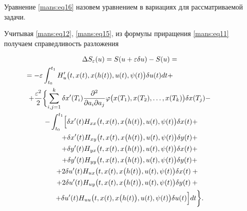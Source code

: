 Уравнение \eqref{mans:eq16} назовем уравнением в вариациях для рассматриваемой задачи.



Учитывая \eqref{mans:eq12}, \eqref{mans:eq15}, из формулы приращения \eqref{mans:eq11} получаем справедливость разложения

\begin{multline}

\Delta S_{\varepsilon}(u)=S(u+\varepsilon \delta u)-S(u) =

\\ 

=-\varepsilon \int_{t_{0}}^{t_{1}} H'_{u} \bigl(t, x(t), x(h(t)), u(t), \psi (t)\bigr) \delta u(t) dt+ \hspace{3cm} \\

+ \frac{\varepsilon^{2}}{2} 

\biggl \lbrace  \sum_{i,j=1}^{k} \delta x'(T_{i})  

\dfrac{\partial^{2}  } {\partial a_{i} \partial a_{j}} 

\varphi\bigl(x(T_{1}), x(T_{2}), \ldots, x(T_{k})\bigr) \delta x(T_{j}) - \hspace{1cm} \\

-\int_{t_{0}}^{t_{1}} 

\Bigl[ \delta x'(t) H_{xx} \bigl(t, x(t), x\bigl(h(t)\bigr), u(t), \psi (t)\bigr) \delta x(t) + \hspace{.85cm}  \\

+\delta x'(t) H_{xy}\bigl(t, x(t), x\bigl(h(t)\bigr), u(t), \psi (t)\bigr) \delta y(t) + \\

+\delta y'(t) H_{yx}\bigl(t, x(t), x\bigl(h(t)\bigr), u(t), \psi (t)\bigr) \delta x(t)+ \\

+\delta y'(t) H_{yy}\bigl(t, x(t), x\bigl(h(t)\bigr), u(t), \psi (t)\bigr) \delta y(t)+ \\

+2 \delta u'(t) H_{ux}\bigl(t, x(t), x\bigl(h(t)\bigr), u(t), \psi (t)\bigr) \delta x(t)+\phantom{2} \\

+2 \delta u'(t) H_{uy}\bigl(t, x(t), x\bigl(h(t)\bigr), u(t), \psi (t)\bigr) \delta y(t)+\phantom{2} \\

  +\delta u'(t) H_{uu}\bigl(t, x(t), x\bigl(h(t)\bigr), u(t), \psi (t)\bigr) \delta u(t) \Bigr]dt \biggr\rbrace . 

\label{mans:eq18}

\end{multline}




